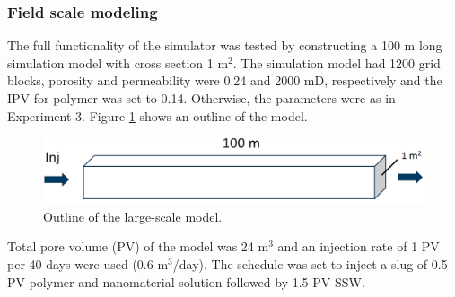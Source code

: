 \documentclass[energies,article,submit,moreauthors,pdftex]{Definitions/mdpi}
\begin{document}


\subsubsection{Field scale modeling}
The full functionality of the simulator was tested by constructing a 100 m long simulation model with cross section 1 m$^2$. The simulation model had 1200 grid blocks, porosity and permeability were 0.24 and 2000 mD, respectively and the  IPV for polymer was set to 0.14. Otherwise, the parameters were as in Experiment 3. Figure \ref{fig:largeScaleModel} shows an outline of the model.
\begin{figure}[h!]
    \centering
    \includegraphics[width=.5\textwidth]{fig/largeScaleModel.png}
    \caption{Outline of the large-scale model. }
    \label{fig:largeScaleModel}
\end{figure}

Total pore volume (PV) of the model was 24 m$^3$ and an injection rate of 1 PV per 40 days were used (0.6 m$^3$/day). The schedule was set to inject a slug of 0.5 PV polymer and nanomaterial solution followed by 1.5 PV SSW. 
\end{document}
